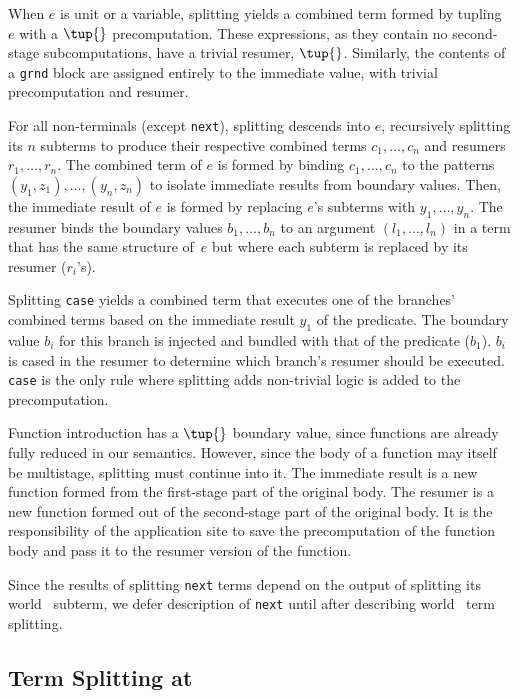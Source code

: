 \begin{abstrsyn}
When $e$ is unit or a variable,
splitting yields a combined term formed by tupling $e$ with a $\tup{}$ precomputation.
These expressions, as they contain no second-stage subcomputations, have a trivial resumer, $\tup{}$.
Similarly, the contents of a \texttt{grnd} block are assigned entirely to the immediate value,
with trivial precomputation and resumer.

For all non-terminals (except \texttt{next}),
splitting descends into $e$, recursively splitting its $n$ subterms
to produce their respective combined terms $c_1,\ldots,c_n$ and resumers $r_1, \ldots, r_n$.
The combined term of $e$ is formed by binding $c_1,\ldots,c_n$
to the patterns $(y_1,z_1),\ldots,(y_n,z_n)$
to isolate immediate results from boundary values. Then,
the immediate result of $e$ is formed by replacing $e$'s subterms with $y_1,\ldots,y_n$.
The resumer binds the boundary values $b_1,\ldots,b_n$ to an
argument $(l_1,\ldots,l_n)$ in a term that has the same structure
of~$e$ but where each subterm is replaced by its resumer ($r_i$'s).

Splitting {\tt case} yields a combined term that executes one of the branches' combined terms based on the immediate result $y_1$ of the predicate.
The boundary value $b_i$ for this branch is injected and bundled with that of the predicate ($b_1$).   
$b_i$ is cased in the resumer to determine which branch's resumer should be executed.
{\tt case} is the only rule where splitting adds non-trivial logic is added to the precomputation.

Function introduction has a $\tup{}$ boundary value,
since functions are already fully reduced in our semantics.
However, since the body of a function may itself be multistage, splitting must continue into it.
The immediate result is a new function formed from the first-stage part of the original body.
The resumer is a new function formed out of the second-stage part of the original body.
It is the responsibility of the application site to save the precomputation of the function body
and pass it to the resumer version of the function.

Since the results of splitting \texttt{next} terms depend on the output of
splitting its world \bbtwo\ subterm,
we defer description of \texttt{next} until after describing world \bbtwo\ term splitting.

\subsection{Term Splitting at \bbtwo}


\end{abstrsyn}
